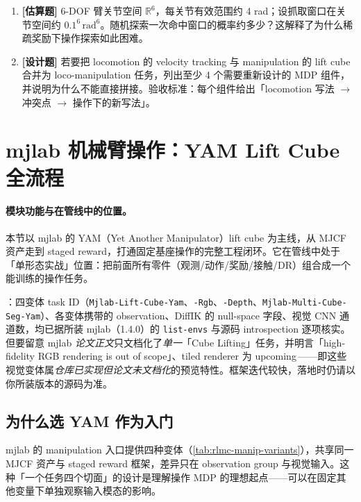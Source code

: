 \begin{practice}[本节练习]
\begin{enumerate}
  \item \textbf{[估算题]} 6-DOF 臂关节空间 $\mathbb{R}^6$，每关节有效范围约 4 rad；设抓取窗口在关节空间约 $0.1^6\,\mathrm{rad}^6$。随机探索一次命中窗口的概率约多少？这解释了为什么稀疏奖励下操作探索如此困难。
  \item \textbf{[设计题]} 若要把 locomotion 的 velocity tracking 与 manipulation 的 lift cube 合并为 loco-manipulation 任务，列出至少 4 个需要重新设计的 MDP 组件，并说明为什么不能直接拼接。验收标准：每个组件给出「locomotion 写法 $\to$ 冲突点 $\to$ 操作下的新写法」。
\end{enumerate}
\end{practice}

\section{mjlab 机械臂操作：YAM Lift Cube 全流程}
\label{sec:rlmc-manip-mjlab}

\paragraph{模块功能与在管线中的位置。}本节以 mjlab 的 YAM（Yet Another Manipulator）lift cube 为主线，从 MJCF 资产走到 staged reward，打通固定基座操作的完整工程闭环。它在管线中处于「单形态实战」位置：把前面所有零件（观测/动作/奖励/接触/DR）组合成一个能训练的操作任务。

：四变体 task ID（\verb|Mjlab-Lift-Cube-Yam|、\verb|-Rgb|、\verb|-Depth|、\verb|Mjlab-Multi-Cube-Seg-Yam|）、各变体携带的 observation、DiffIK 的 null-space 字段、视觉 CNN 通道数，均已据所装 mjlab（1.4.0）的 \verb|list-envs| 与源码 introspection 逐项核实。但要留意 mjlab \emph{论文正文}只文档化了\emph{单一}「Cube Lifting」任务，并明言「high-fidelity RGB rendering is out of scope」、tiled renderer 为 upcoming\,\cite{zakka2026mjlab}——即这些视觉变体属\emph{仓库已实现但论文未文档化}的预览特性。框架迭代较快，落地时仍请以你所装版本的源码为准。

\subsection{为什么选 YAM 作为入门}
\label{sec:rlmc-manip-yam}

mjlab 的 manipulation 入口提供四种变体（\cref{tab:rlmc-manip-variants}），共享同一 MJCF 资产与 staged reward 框架，差异只在 observation group 与视觉输入。这种「一个任务四个切面」的设计是理解操作 MDP 的理想起点——可以在固定其他变量下单独观察输入模态的影响。

